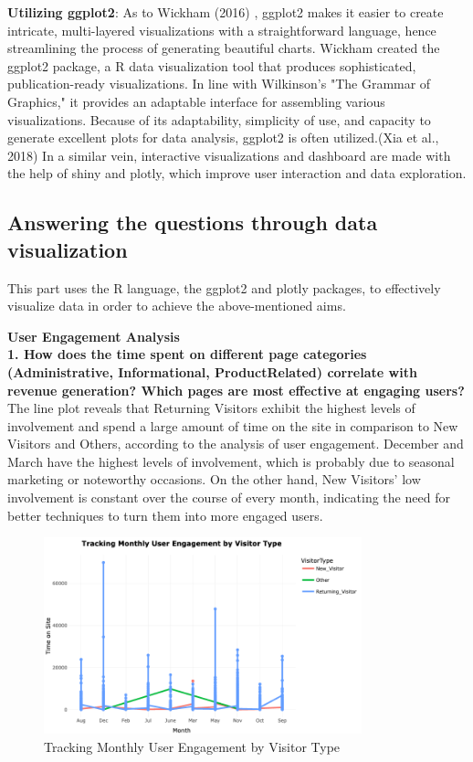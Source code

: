 \documentclass[12pt]{article}
\begin{document}
\textbf{Utilizing ggplot2}: As to Wickham (2016) \cite{Wickham}, ggplot2 makes it easier to create intricate, multi-layered visualizations with a straightforward language, hence streamlining the process of generating beautiful charts. Wickham created the ggplot2 package, a R data visualization tool that produces sophisticated, publication-ready visualizations. In line with Wilkinson's "The Grammar of Graphics," it provides an adaptable interface for assembling various visualizations. Because of its adaptability, simplicity of use, and capacity to generate excellent plots for data analysis, ggplot2 is often utilized.(Xia et al., 2018) \cite{Xia} In a similar vein, interactive visualizations and dashboard are  made with the help of shiny and plotly, which improve user interaction and data exploration.


\subsection{Answering the questions through data visualization}
This part uses the R language, the ggplot2 and plotly packages, to effectively visualize data in order to achieve the above-mentioned aims.

\vspace{0.5cm}

\textbf{User Engagement Analysis} \\

\textbf{1. How does the time spent on different page categories (Administrative, Informational, ProductRelated) correlate with revenue generation? Which pages are most effective at engaging users?} \\[5pt] %

The line plot reveals that Returning Visitors exhibit the highest levels of involvement and spend a large amount of time on the site in comparison to New Visitors and Others, according to the analysis of user engagement. December and March have the highest levels of involvement, which is probably due to seasonal marketing or noteworthy occasions. On the other hand, New Visitors' low involvement is constant over the course of every month, indicating the need for better techniques to turn them into more engaged users.


\begin{figure}[h]
    \centering
    \includegraphics[width=0.82\textwidth]{Trackig monthly user engangement based on month.png}  
    \caption{Tracking Monthly User Engagement by Visitor Type}
\end{figure}
\end{document}
